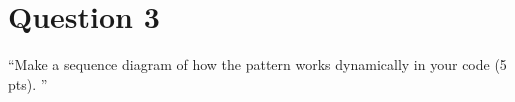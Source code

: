 \section{Question 3}

``Make a sequence diagram of how the pattern works dynamically in your code (5 pts). '' \\